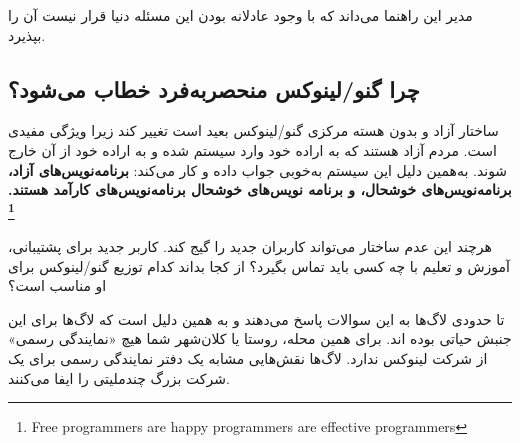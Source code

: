 \begin{note}
مدیر این راهنما می‌داند که با وجود عادلانه بودن این مسئله دنیا قرار نیست آن را بپذیرد.
\end{note}

\subsection{چرا گنو/لینوکس منحصربه‌فرد خطاب می‌شود؟}

ساختار آزاد و بدون هسته مرکزی گنو/لینوکس بعید است تغییر کند زیرا ویژگی مفیدی است.
مردم آزاد هستند که به اراده خود وارد سیستم شده و به اراده خود از آن خارج شوند.
به‌همین دلیل این سیستم ‫به‌خوبی جواب داده و کار می‌کند:
{\bfseries
برنامه‌نویس‌های آزاد، برنامه‌نویس‌های خوشحال، و برنامه نویس‌های خوشحال برنامه‌نویس‌های کارآمد هستند.
\footnote{Free programmers are happy programmers are effective programmers}
}

هرچند این عدم ساختار می‌تواند کاربران جدید را گیج کند.
کاربر جدید برای پشتیبانی، آموزش و تعلیم با چه کسی باید تماس بگیرد؟
از کجا بداند کدام توزیع گنو/لینوکس برای او مناسب است؟

تا حدودی لاگ‌ها به این سوالات پاسخ می‌دهند و به همین دلیل است که لاگ‌ها برای این جنبش حیاتی بوده اند.
برای همین محله، روستا یا کلان‌شهر شما هیچ «نمایندگی رسمی» از شرکت لینوکس ندارد.
لاگ‌ها نقش‌هایی مشابه یک دفتر نمایندگی رسمی برای یک شرکت بزرگ چندملیتی را ایفا می‌کنند.

